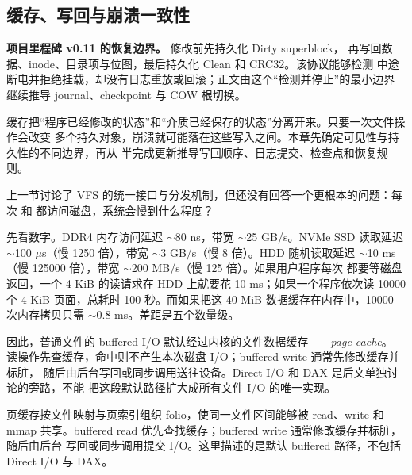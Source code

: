 \begin{filesystemlayout}

\chapter{缓存、写回与崩溃一致性}
\begin{statebox}
\textbf{项目里程碑 v0.11 的恢复边界。} 修改前先持久化 Dirty superblock，
再写回数据、inode、目录项与位图，最后持久化 Clean 和 CRC32。该协议能够检测
中途断电并拒绝挂载，却没有日志重放或回滚；正文由这个“检测并停止”的最小边界
继续推导 journal、checkpoint 与 COW 根切换。
\end{statebox}
\begin{keyidea}
缓存把“程序已经修改的状态”和“介质已经保存的状态”分离开来。只要一次文件操作会改变
多个持久对象，崩溃就可能落在这些写入之间。本章先确定可见性与持久性的不同边界，再从
半完成更新推导写回顺序、日志提交、检查点和恢复规则。
\end{keyidea}





上一节讨论了 VFS 的统一接口与分发机制，但还没有回答一个更根本的问题：每次  和  都访问磁盘，系统会慢到什么程度？

先看数字。DDR4 内存访问延迟 $\sim$80 ns，带宽 $\sim$25 GB/s。NVMe SSD 读取延迟 $\sim$100 $\mu$s（慢 1250 倍），带宽 $\sim$3 GB/s（慢 8 倍）。HDD 随机读取延迟 $\sim$10 ms（慢 125000 倍），带宽 $\sim$200 MB/s（慢 125 倍）。如果用户程序每次  都要等磁盘返回，一个 4 KiB 的读请求在 HDD 上就要花 10 ms；如果一个程序依次读 10000 个 4 KiB 页面，总耗时 100 秒。而如果把这 40 MiB 数据缓存在内存中，10000 次内存拷贝只需 $\sim$0.8 ms。差距是五个数量级。

因此，普通文件的 buffered I/O 默认经过内核的文件数据缓存——\emph{page cache}。
读操作先查缓存，命中则不产生本次磁盘 I/O；buffered write 通常先修改缓存并标脏，
随后由后台写回或同步调用送往设备。Direct I/O 和 DAX 是后文单独讨论的旁路，不能
把这段默认路径扩大成所有文件 I/O 的唯一实现。

页缓存按文件映射与页索引组织 folio，使同一文件区间能够被 read、write 和 mmap
共享。buffered read 优先查找缓存；buffered write 通常修改缓存并标脏，随后由后台
写回或同步调用提交 I/O。这里描述的是默认 buffered 路径，不包括 Direct I/O 与 DAX。



\end{filesystemlayout}
